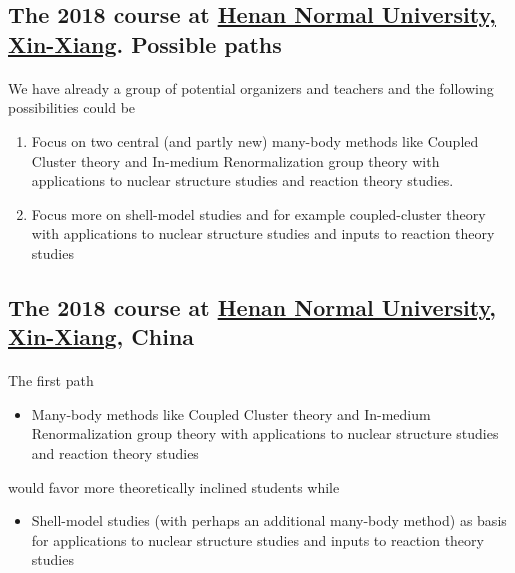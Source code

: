 \documentclass[%
oneside,                 %
final,                   %
10pt]{article}
\begin{document}
\noindent




\subsection{The 2018 course at \href{{http://www.htu.cn/english/}}{Henan Normal University, Xin-Xiang}. Possible paths}

\paragraph{}
We have already a group of potential organizers and teachers and the following possibilities could be
\begin{enumerate}
\item Focus on two central (and partly new) many-body methods like Coupled Cluster theory and In-medium Renormalization group theory with applications to nuclear structure studies and reaction theory studies.

\item Focus more on shell-model studies and for example coupled-cluster theory with applications to nuclear structure studies and inputs to reaction theory studies
\end{enumerate}

\noindent







\subsection{The 2018 course at \href{{http://www.htu.cn/english/}}{Henan Normal University, Xin-Xiang}, China}

\paragraph{}
The first path
\begin{itemize}
\item Many-body methods like Coupled Cluster theory and In-medium Renormalization group theory with applications to nuclear structure studies and reaction theory studies
\end{itemize}

\noindent
would favor more theoretically inclined students while
\begin{itemize}
\item Shell-model studies (with perhaps an additional many-body method) as basis for applications to nuclear structure studies and inputs to reaction theory studies
\end{itemize}
\end{document}

